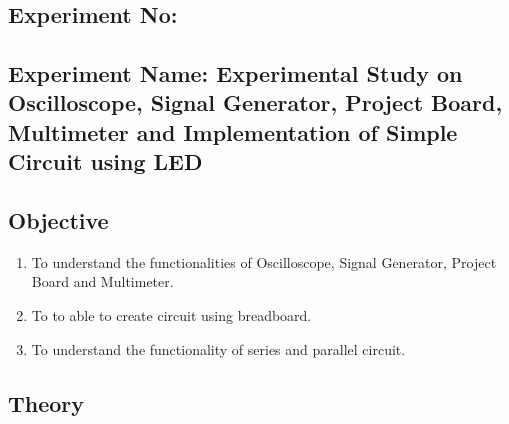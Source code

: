 \documentclass{report}
\begin{document}
\chapter[Experimental Study on Oscilloscope, Signal Generator, Project Board,
  Multimeter and Implementation of Simple Circuit using LED]{}
\setcounter{chapter}{1}
\section*{Experiment No:  \thechapter}
\section*{Experiment Name: Experimental Study on Oscilloscope, Signal Generator, Project Board,
  Multimeter and Implementation of Simple Circuit using LED}
\section{Objective}
\begin{enumerate}
  \item To understand the functionalities of Oscilloscope, Signal Generator, Project
        Board and Multimeter.
  \item To to able to create circuit using breadboard.
  \item To understand the functionality of series and parallel circuit.
\end{enumerate}

\section{Theory}
\end{document}
